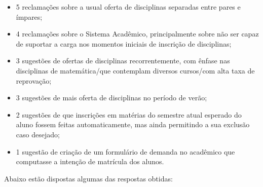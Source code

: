         \begin{itemize}
            \item 5 reclamações sobre a usual oferta de disciplinas separadas entre pares e ímpares;
            \item 4 reclamações sobre o Sistema Acadêmico, principalmente sobre não ser capaz de suportar a carga nos momentos iniciais de inscrição de disciplinas;
            \item 3 sugestões de ofertas de disciplinas recorrentemente, com ênfase nas disciplinas de matemática/que contemplam diversos cursos/com alta taxa de reprovação;
            \item 3 sugestões de mais oferta de disciplinas no período de verão;
            \item 2 sugestões de que inscrições em matérias do semestre atual esperado do aluno fossem feitas automaticamente, mas ainda permitindo a sua exclusão caso desejado;
            \item 1 sugestão de criação de um formulário de demanda no acadêmico que computasse a intenção de matrícula dos alunos.
        \end{itemize}

        Abaixo estão dispostas algumas das respostas obtidas:
        

